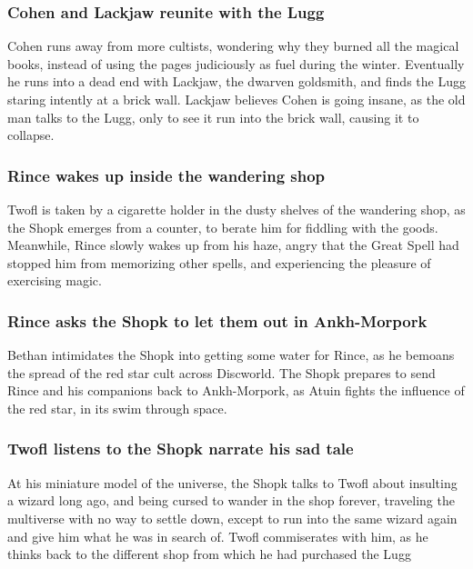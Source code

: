 \subsubsection{\Gls{Cohen} and \Gls{Lackjaw} reunite with the \Gls{Lugg}}
\Gls{Cohen} runs away from more cultists, wondering why they burned all the magical books, instead
of using the pages judiciously as fuel during the winter. Eventually he runs into a dead end with
\Gls{Lackjaw}, the dwarven goldsmith, and finds the \Gls{Lugg} staring intently at a brick wall.
\Gls{Lackjaw} believes \Gls{Cohen} is going insane, as the old man talks to the \Gls{Lugg}, only
to see it run into the brick wall, causing it to collapse.

\subsubsection{\Gls{Rince} wakes up inside the wandering shop}
\Gls{Twofl} is taken by a cigarette holder in the dusty shelves of the wandering shop, as the
\Gls{Shopk} emerges from a counter, to berate him for fiddling with the goods. Meanwhile,
\Gls{Rince} slowly wakes up from his haze, angry that the Great Spell had stopped him from
memorizing other spells, and experiencing the pleasure of exercising magic.

\subsubsection{\Gls{Rince} asks the \Gls{Shopk} to let them out in Ankh-Morpork}
\Gls{Bethan} intimidates the \Gls{Shopk} into getting some water for \Gls{Rince}, as he bemoans the
spread of the red star cult across Discworld. The \Gls{Shopk} prepares to send \Gls{Rince} and his
companions back to Ankh-Morpork, as \Gls{Atuin} fights the influence of the red star, in its swim
through space.

\subsubsection{\Gls{Twofl} listens to the \Gls{Shopk} narrate his sad tale}
At his miniature model of the universe, the \Gls{Shopk} talks to \Gls{Twofl} about insulting a
wizard long ago, and being cursed to wander in the shop forever, traveling the multiverse with no
way to settle down, except to run into the same wizard again and give him what he was in search of.
\Gls{Twofl} commiserates with him, as he thinks back to the different shop from which he had
purchased the \Gls{Lugg}

